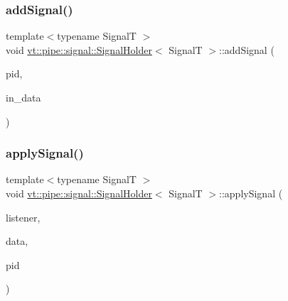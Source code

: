 \mbox{\label{structvt_1_1pipe_1_1signal_1_1_signal_holder_ae32b546852bc4518b6d75f2e43a5eb5f}} 
\subsubsection{\texorpdfstring{add\+Signal()}{addSignal()}}
{\footnotesize\ttfamily template$<$typename SignalT $>$ \\
void \hyperlink{structvt_1_1pipe_1_1signal_1_1_signal_holder}{vt\+::pipe\+::signal\+::\+Signal\+Holder}$<$ SignalT $>$\+::add\+Signal (\begin{DoxyParamCaption}\item[{\hyperlink{namespacevt_ac9852acda74d1896f48f406cd72c7bd3}{Pipe\+Type} const \&}]{pid,  }\item[{\hyperlink{structvt_1_1pipe_1_1signal_1_1_signal_holder_aad5bfc2b46dfa071ae638385324d7e31}{Data\+Ptr\+Type}}]{in\+\_\+data }\end{DoxyParamCaption})}

\mbox{\label{structvt_1_1pipe_1_1signal_1_1_signal_holder_a611fe4b2ce38900245e2f4a9dd40d5dc}} 
\subsubsection{\texorpdfstring{apply\+Signal()}{applySignal()}}
{\footnotesize\ttfamily template$<$typename SignalT $>$ \\
void \hyperlink{structvt_1_1pipe_1_1signal_1_1_signal_holder}{vt\+::pipe\+::signal\+::\+Signal\+Holder}$<$ SignalT $>$\+::apply\+Signal (\begin{DoxyParamCaption}\item[{\hyperlink{structvt_1_1pipe_1_1signal_1_1_signal_holder_a68114d1ad5804c71e014736b18e41e08}{Listener\+Ptr\+Type}}]{listener,  }\item[{\hyperlink{structvt_1_1pipe_1_1signal_1_1_signal_holder_aad5bfc2b46dfa071ae638385324d7e31}{Data\+Ptr\+Type}}]{data,  }\item[{\hyperlink{namespacevt_ac9852acda74d1896f48f406cd72c7bd3}{Pipe\+Type} const \&}]{pid }\end{DoxyParamCaption})}

